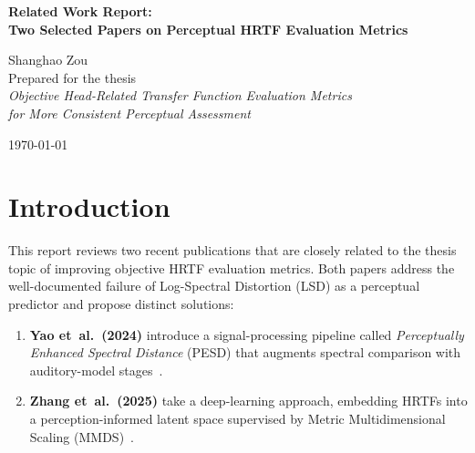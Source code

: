 \documentclass[12pt,a4paper]{article}
\begin{document}
\thispagestyle{empty}

\vspace*{2cm}

\begin{center}
{\LARGE \textbf{Related Work Report:\\
Two Selected Papers on Perceptual HRTF Evaluation Metrics}}
\end{center}

\vspace{1cm}

\begin{center}
Shanghao Zou\\[0.3cm]
{\small Prepared for the thesis\\
\textit{Objective Head-Related Transfer Function Evaluation Metrics\\
for More Consistent Perceptual Assessment}}
\end{center}

\vspace{0.5cm}

\begin{center}
\today
\end{center}

\newpage
{}

\section{Introduction}

This report reviews two recent publications that are closely related to the
thesis topic of improving objective HRTF evaluation metrics.  Both papers
address the well-documented failure of Log-Spectral Distortion (LSD) as a
perceptual predictor and propose distinct solutions:

\begin{enumerate}[label=(\roman*)]
  \item \textbf{Yao et~al.\ (2024)} introduce a signal-processing pipeline
        called \emph{Perceptually Enhanced Spectral Distance} (PESD) that
        augments spectral comparison with auditory-model stages~\cite{yao2024pesd}.
  \item \textbf{Zhang et~al.\ (2025)} take a deep-learning approach,
        embedding HRTFs into a perception-informed latent space supervised by
        Metric Multidimensional Scaling (MMDS)~\cite{zhang2025perception}.
\end{enumerate}
\end{document}
